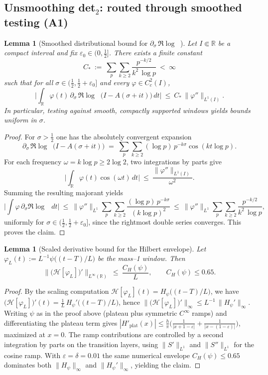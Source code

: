 \documentclass[11pt]{article}
\newtheorem{lemma}[theorem]{Lemma}
\theoremstyle{definition}
\theoremstyle{remark}
\newcommand{\R}{\mathbb{R}}
\DeclareMathOperator{\dettwo}{det_2}
\begin{document}
\subsection*{Unsmoothing det$_2$: routed through smoothed testing (A1)}
\begin{lemma}[Smoothed distributional bound for $\partial_\sigma\,\Re\log\dettwo$]\label{lem:det2-unsmoothed}
Let $I\Subset\R$ be a compact interval and fix $\varepsilon_0\in(0,\tfrac12]$. There exists a finite constant
\[
  C_*\ :=\ \sum_{p}\sum_{k\ge 2}\frac{p^{-k/2}}{k^2\,\log p}\ <\ \infty
\]
such that for all $\sigma\in(\tfrac12,\tfrac12+\varepsilon_0]$ and every $\varphi\in C_c^2(I)$,
\[
  \Big|\int_{\R} \varphi(t)\,\partial_\sigma\,\Re\log\dettwo\big(I-A(\sigma+it)\big)\,dt\Big|\ \le\ C_*\,\|\varphi''\|_{L^1(I)}.
\]
In particular, testing against smooth, compactly supported windows yields bounds uniform in $\sigma$.
\end{lemma}
\begin{proof}
For $\sigma>\tfrac12$ one has the absolutely convergent expansion
\[
  \partial_\sigma\,\Re\log\dettwo\big(I-A(\sigma+it)\big)
  \;=\; \sum_{p}\sum_{k\ge 2} (\log p)\,p^{-k\sigma}\cos(k t\log p).
\]
For each frequency $\omega=k\log p\ge 2\log 2$, two integrations by parts give
\[
  \Big|\int_{\R}\!\varphi(t)\cos(\omega t)\,dt\Big|\ \le\ \frac{\|\varphi''\|_{L^1(I)}}{\omega^2}.
\]
Summing the resulting majorant yields
\[
  \Big|\int \varphi\,\partial_\sigma\Re\log\dettwo\,dt\Big|
  \ \le\ \|\varphi''\|_{L^1}\sum_{p}\sum_{k\ge 2}\frac{(\log p)\,p^{-k\sigma}}{(k\log p)^2}
  \ \le\ \|\varphi''\|_{L^1}\sum_{p}\sum_{k\ge 2}\frac{p^{-k/2}}{k^2\,\log p},
\]
uniformly for $\sigma\in(\tfrac12,\tfrac12+\varepsilon_0]$, since the rightmost double series converges. This proves the claim.
\end{proof}

\begin{lemma}[Scaled derivative bound for the Hilbert envelope]\label{lem:hilbert-derivative}
Let $\varphi_L(t):=L^{-1}\psi\big((t-T)/L\big)$ be the mass--1 window. Then
\[
  \big\|\big(\mathcal H[\varphi_L]\big)'\big\|_{L^\infty(\R)}\ \le\ \frac{C_H(\psi)}{L},\qquad C_H(\psi)\le 0.65.
\]
\end{lemma}
\begin{proof}
By the scaling computation $\mathcal H[\varphi_L](t)=H_\psi\big((t{-}T)/L\big)$, we have $\big(\mathcal H[\varphi_L]\big)'(t)=\tfrac1L\,H_\psi'\big((t{-}T)/L\big)$, hence $\|\big(\mathcal H[\varphi_L]\big)'\|_\infty\le L^{-1}\,\|H_\psi'\|_\infty$. Writing $\psi$ as in the proof above (plateau plus symmetric $C^\infty$ ramps) and differentiating the plateau term gives $|H'_{\text{plat}}(x)|\le \tfrac{h}{\pi}\big(\tfrac{1}{|x{+}1{-}\varepsilon|}+\tfrac{1}{|x{-}(1{-}\varepsilon)|}\big)$, maximized at $x=0$. The ramp contributions are controlled by a second integration by parts on the transition layers, using $\|S'\|_{L^1}$ and $\|S''\|_{L^1}$ for the cosine ramp. With $\varepsilon=\delta=0.01$ the same numerical envelope $C_H(\psi)\le 0.65$ dominates both $\|H_\psi\|_\infty$ and $\|H_\psi'\|_\infty$, yielding the claim.
\end{proof}
\end{document}
